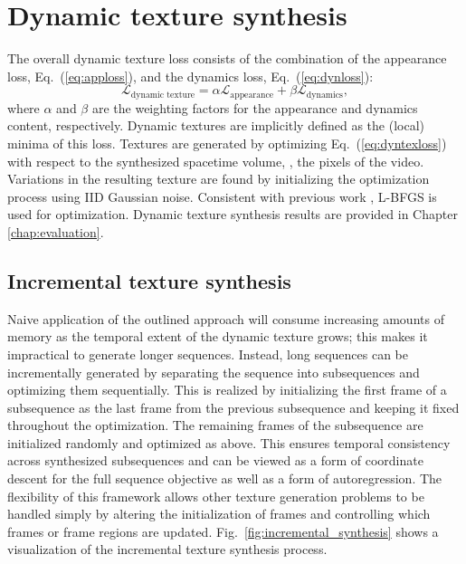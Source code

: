 \section{Dynamic texture synthesis}\label{sec:texgen}
The overall dynamic texture loss consists of the combination of the appearance loss, Eq.\ (\ref{eq:apploss}),
and the dynamics loss, Eq.\ (\ref{eq:dynloss}):
\begin{equation}
   \mathcal{L}_\text{dynamic texture} = \alpha\mathcal{L}_\text{appearance} + \beta \mathcal{L}_\text{dynamics}, \label{eq:dyntexloss}
\end{equation}
where $\alpha$ and $\beta$ are the weighting factors for the
appearance and dynamics content, respectively.
Dynamic textures are implicitly defined as the (local) minima 
of this loss.
Textures are generated by optimizing Eq.\ 
(\ref{eq:dyntexloss}) with respect to the synthesized spacetime volume,
\ie, the pixels of the video. 
Variations in the resulting texture are found by initializing the
optimization process using IID Gaussian noise.
Consistent with previous work \cite{gatys2015}, L-BFGS \cite{liu1989} is used for optimization. Dynamic texture synthesis results are provided in Chapter \ref{chap:evaluation}.

\subsection{Incremental texture synthesis}\label{sec:incremental_synthesis}

Naive application of the outlined approach will consume
increasing amounts of memory as the temporal extent of the 
dynamic texture grows; this makes it impractical to generate
longer sequences.
Instead, long sequences can be incrementally generated by
separating the sequence into subsequences and optimizing them 
sequentially. This is realized by initializing the first frame of a subsequence as the last 
frame from the previous subsequence and keeping it fixed throughout
the optimization.
The remaining frames of the subsequence are initialized randomly and
optimized as above.
This ensures temporal consistency across synthesized subsequences
and can be viewed as a form of coordinate descent for the full
sequence objective as well as a form of autoregression.
The flexibility of this framework allows other texture generation
problems to be handled simply by altering the 
initialization of frames and controlling which
frames or frame regions are updated. Fig.\ \ref{fig:incremental_synthesis}
shows a visualization of the incremental texture synthesis process.

